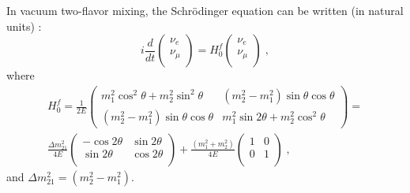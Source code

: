 In vacuum two-flavor mixing, the Schr\"{o}dinger equation can be written (in natural units) \cite{xing2011neutrinos}:
\begin{equation}\label{eq:2flavor_simple}
	i\frac{d}{dt}\begin{pmatrix}
		\nu_e\\
		\nu_\mu\\
	\end{pmatrix}
	=
	H^f_0
	\begin{pmatrix}
		\nu_e\\
		\nu_\mu\\
	\end{pmatrix}\;,
\end{equation}
where
\begin{equation} \label{eq:H0f}
\begin{aligned}
 H^f_0 = \frac{1}{2E}\begin{pmatrix}m^2_1\cos^2\theta+m^2_2\sin^2\theta & (m^2_2-m^2_1)\sin\theta\cos\theta \\ (m^2_2-m^2_1)\sin\theta\cos\theta & m^2_1\sin2\theta+m^2_2\cos^2\theta\end{pmatrix} =
\\
\frac{\Delta m_{21}^2}{4E}\begin{pmatrix}
	-\cos 2\theta & \sin 2\theta\\
	\sin 2\theta & \cos 2\theta\\
\end{pmatrix}+\frac{(m_1^2+m_2^2)}{4E}\begin{pmatrix}
	1 & 0\\
	0 &1\\
\end{pmatrix}\;,
\end{aligned}
\end{equation}
and $\Delta m^2_{21}=(m^2_2 - m^2_1)$.

